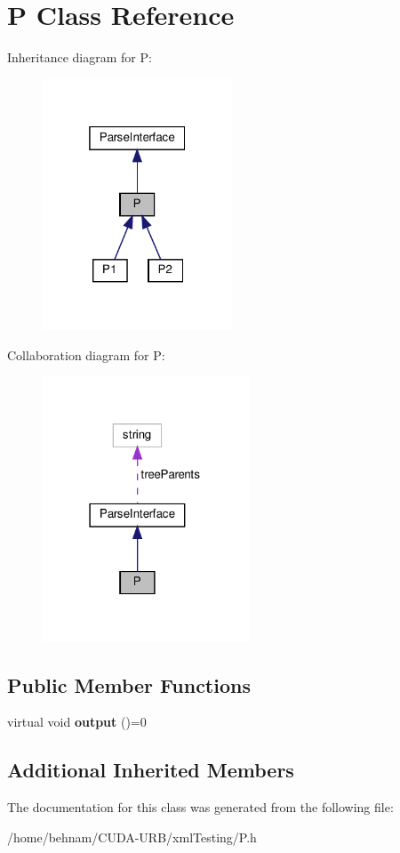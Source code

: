 \hypertarget{classP}{}\section{P Class Reference}
\label{classP}


Inheritance diagram for P\+:
\nopagebreak
\begin{figure}[H]
\begin{center}
\leavevmode
\includegraphics[width=160pt]{classP__inherit__graph}
\end{center}
\end{figure}


Collaboration diagram for P\+:
\nopagebreak
\begin{figure}[H]
\begin{center}
\leavevmode
\includegraphics[width=174pt]{classP__coll__graph}
\end{center}
\end{figure}
\subsection*{Public Member Functions}
\begin{DoxyCompactItemize}
\item 
\mbox{\label{classP_ad4c6552ef6e0bca9f4217af419abf12b}} 
virtual void {\bfseries output} ()=0
\end{DoxyCompactItemize}
\subsection*{Additional Inherited Members}


The documentation for this class was generated from the following file\+:\begin{DoxyCompactItemize}
\item 
/home/behnam/\+C\+U\+D\+A-\/\+U\+R\+B/xml\+Testing/P.\+h\end{DoxyCompactItemize}
